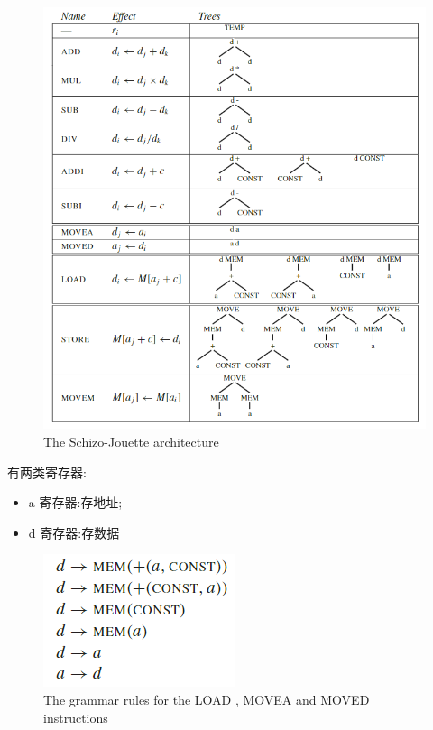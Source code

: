 \begin{figure}[H]
    \centering
    \includegraphics[width=0.98\linewidth]{pic/CP9/The Schizo-Jouette architecture}
    \caption{The Schizo-Jouette architecture}
\end{figure}


有两类寄存器:
\begin{itemize}
    \item a 寄存器:存地址;
    \item d 寄存器:存数据
\end{itemize}

\begin{figure}[H]
    \centering
    \includegraphics[width=0.32\linewidth]{pic/CP9/The grammar rules}
    \caption{The grammar rules for the LOAD , MOVEA and MOVED instructions}
\end{figure}


